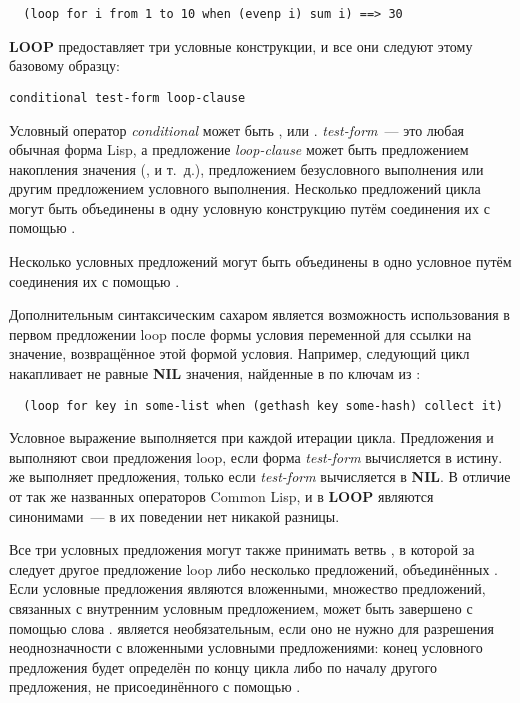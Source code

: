 \begin{lstlisting}
  (loop for i from 1 to 10 when (evenp i) sum i) ==> 30
\end{lstlisting}

\textbf{LOOP} предоставляет три условные конструкции, и все они следуют этому базовому образцу:

\begin{lstlisting}[style=lisprepl]
    conditional test-form loop-clause
\end{lstlisting}

Условный оператор \textit{conditional} может быть ,  или
. \textit{test-form}~--- это любая обычная форма Lisp, а предложение
\textit{loop-clause} может быть предложением накопления значения (,
 и т.~д.), предложением безусловного выполнения или другим предложением
условного выполнения. Несколько предложений цикла могут быть объединены в одну условную
конструкцию путём соединения их с помощью .

Несколько условных предложений могут быть объединены в одно условное путём соединения их
с помощью .

Дополнительным синтаксическим сахаром является возможность использования в первом
предложении loop после формы условия переменной  для ссылки на значение,
возвращённое этой формой условия. Например, следующий цикл накапливает не равные
\textbf{NIL} значения, найденные в  по ключам из :

\begin{lstlisting}
  (loop for key in some-list when (gethash key some-hash) collect it)
\end{lstlisting}

Условное выражение выполняется при каждой итерации цикла. Предложения  и
 выполняют свои предложения loop, если форма \textit{test-form} вычисляется в
истину.  же выполняет предложения, только если \textit{test-form} вычисляется
в \textbf{NIL}. В отличие от так же названных операторов Common Lisp,  и
 в \textbf{LOOP} являются синонимами~--- в их поведении нет никакой разницы.

Все три условных предложения могут также принимать ветвь , в которой за
 следует другое предложение loop либо несколько предложений, объединённых
. Если условные предложения являются вложенными, множество предложений,
связанных с внутренним условным предложением, может быть завершено с помощью слова
.  является необязательным, если оно не нужно для разрешения
неоднозначности с вложенными условными предложениями: конец условного предложения будет
определён по концу цикла либо по началу другого предложения, не присоединённого с помощью
.


